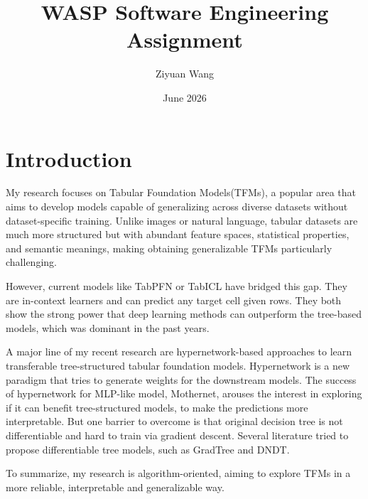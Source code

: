 \documentclass[11pt]{article}
\title{WASP Software Engineering Assignment}
\author{Ziyuan Wang}
\date{June 2026}
\begin{document}
\maketitle


\section{Introduction}

My research focuses on Tabular Foundation Models(TFMs), a popular area that aims to develop models capable of generalizing across diverse datasets without dataset-specific training. Unlike images or natural language, tabular datasets are much more structured but with abundant feature spaces, statistical properties, and semantic meanings, making obtaining generalizable TFMs particularly challenging.

However, current models like TabPFN\cite{hollmann2022tabpfn}\cite{hollmann2025accurate} or TabICL\cite{qu2025tabicl}\cite{qu2026tabiclv2} have bridged this gap. They are in-context learners and can predict any target cell given rows. They both show the strong power that deep learning methods can outperform the tree-based models, which was dominant in the past years\cite{grinsztajn2022tree}. 

A major line of my recent research are hypernetwork-based approaches to learn transferable tree-structured tabular foundation models. Hypernetwork is a new paradigm that tries to generate weights for the downstream models. The success of hypernetwork for MLP-like model, Mothernet\cite{muller2023mothernet}, arouses the interest in exploring if it can benefit tree-structured models, to make the predictions more interpretable. But one barrier to overcome is that original decision tree is not differentiable and hard to train via gradient descent. Several literature tried to propose differentiable tree models, such as GradTree\cite{marton2024gradtree} and DNDT\cite{yang2018deep}. 


To summarize, my research is algorithm-oriented, aiming to explore TFMs in a more reliable, interpretable and generalizable way. 
\end{document}
